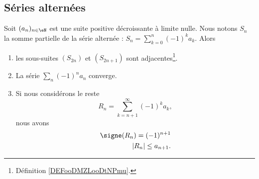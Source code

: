 \subsection{Séries alternées}

\begin{theorem}      \label{THOooOHANooHYfkII}
	Soit \( (a_n)_{n\in \eN}\) est une suite positive décroissante à limite nulle. Nous notons \( S_n\) la somme partielle de la série alternée : \( S_n=\sum_{k=0}^n(-1)^ka_k\). Alors
	\begin{enumerate}
		\item
		      les sous-suites \( (S_{2n})\) et \( (S_{2n+1})\) sont adjacentes\footnote{Définition \ref{DEFooDMZLooDtNPmu}.}.
		\item		\label{ITEMooWNCXooWAYRdm}
		      La série \( \sum_n(-1)^na_n\) converge.
		\item       \label{ITEMooWEPWooXhLMYL}
		      Si nous considérons le reste
		      \begin{equation}
			      R_n=\sum_{k=n+1}^{\infty}(-1)^ka_k,
		      \end{equation}
		      nous avons
		      \begin{subequations}
			      \begin{align}
				      \signe(R_n)=(-1)^{n+1} \\
				      | R_n |\leq a_{n+1}.
			      \end{align}
		      \end{subequations}
	\end{enumerate}
\end{theorem}

